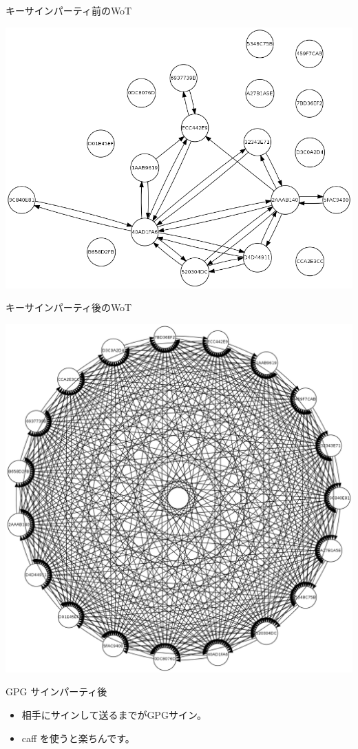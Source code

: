 \begin{frame}{キーサインパーティ前のWoT}
\begin{center}
\includegraphics[width=1.0\hsize]{image201111/osc2011-tokyo-fall-ksp.png}
\end{center}
\end{frame}


\begin{frame}{キーサインパーティ後のWoT}
\begin{center}
\includegraphics[width=0.7\hsize]{image201111/osc2011-tokyo-fall-ksp0.png}
\end{center}
\end{frame}

\begin{frame}{GPG サインパーティ後}

\begin{itemize}
\item 相手にサインして送るまでがGPGサイン。
\item caff を使うと楽ちんです。
\end{itemize}

\end{frame}


